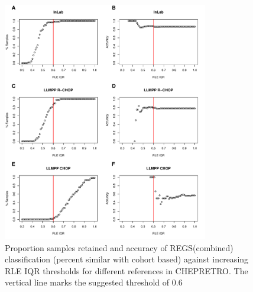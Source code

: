 \begin{figure}
	\begin{center}
		\includegraphics[width=0.8\textwidth]{figures/chep_rle_classification_regs.pdf}
	\end{center}
	\caption{Proportion samples retained and accuracy of REGS(combined) classification (percent similar with cohort based) against increasing RLE IQR thresholds for different references in CHEPRETRO. The vertical line marks the suggested threshold of 0.6}
	\label{fig:chep_rle_clas_regs}
\end{figure}

